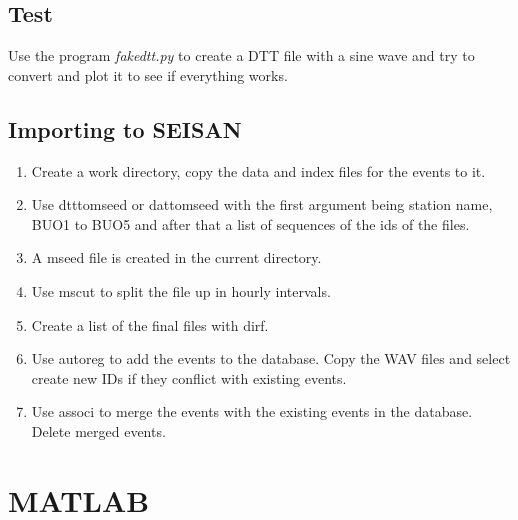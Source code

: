 \documentclass[a4paper]{article}
\begin{document}
\begin{multicols}{2}
    \subsection{Test}
    Use the program \textit{fakedtt.py} to create a DTT file with a sine
    wave and try to convert and plot it to see if everything works.

    \subsection{Importing to SEISAN}
      \begin{enumerate}
        \item Create a work directory, copy the data and index files for
          the events to it.
        \item Use dtttomseed or dattomseed with the first argument being
          station name, BUO1 to BUO5 and after that a list of sequences
          of the ids of the files.
        \item A mseed file is created in the current directory.
        \item Use mscut to split the file up in hourly intervals.
        \item Create a list of the final files with dirf.
        \item Use autoreg to add the events to the database. Copy the
          WAV files and select create new IDs if they conflict with
          existing events.
        \item Use associ to merge the events with the existing events in
          the database. Delete merged events.
      \end{enumerate}
  \section{MATLAB}


\end{multicols}
\end{document}
